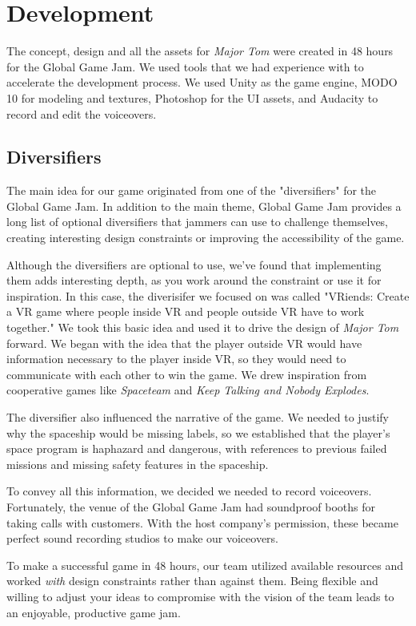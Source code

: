 \documentclass[sigconf]{acmart}
\begin{document}
\section{Development}
The concept, design and all the assets for \textit{Major Tom} were created in 48 hours for the Global Game Jam. We used tools that we had experience with to accelerate the development process. We used Unity as the game engine, MODO 10 for modeling and textures, Photoshop for the UI assets, and Audacity to record and edit the voiceovers.

\subsection{Diversifiers}
The main idea for our game originated from one of the "diversifiers" for the Global Game Jam. In addition to the main theme, Global Game Jam provides a long list of optional diversifiers that jammers can use to challenge themselves, creating interesting design constraints or improving the accessibility of the game.

Although the diversifiers are optional to use, we've found that implementing them adds interesting depth, as you work around the constraint or use it for inspiration. In this case, the diverisifer we focused on was called "VRiends: Create a VR game where people inside VR and people outside VR have to work together." We took this basic idea and used it to drive the design of \textit{Major Tom} forward. We began with the idea that the player outside VR would have information necessary to the player inside VR, so they would need to communicate with each other to win the game. We drew inspiration from cooperative games like \textit{Spaceteam} and \textit{Keep Talking and Nobody Explodes}.

The diversifier also influenced the narrative of the game. We needed to justify why the spaceship would be missing labels, so we established that the player's space program is haphazard and dangerous, with references to previous failed missions and missing safety features in the spaceship.

To convey all this information, we decided we needed to record voiceovers. Fortunately, the venue of the Global Game Jam had soundproof booths for taking calls with customers. With the host company's permission, these became perfect sound recording studios to make our voiceovers.

To make a successful game in 48 hours, our team utilized available resources and worked \textit{with} design constraints rather than against them. Being flexible and willing to adjust your ideas to compromise with the vision of the team leads to an enjoyable, productive game jam.
\end{document}
